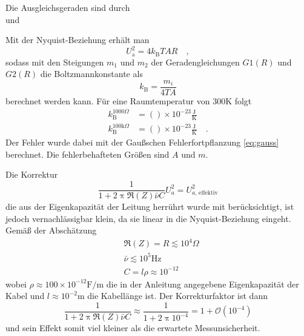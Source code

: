 		Die Ausgleichsgeraden sind durch
		\begin{equation}
			
		\end{equation}
		und
		\begin{equation}
			
		\end{equation}

		Mit der Nyquist-Beziehung erhält man
		\begin{equation}
			U_\text{a}^2 =4k_\text{B}T A R \quad ,
		\end{equation}
		sodass mit den Steigungen $m_1$ und $m_2$ der Geradengleichungen $G1(R)$ und $G2(R)$
		die Boltzmannkonstante als
		\begin{equation}
		k_\text{B}=\frac{m_i}{4 T A}
		\end{equation}
		berechnet werden kann. Für eine Raumtemperatur von $300$K folgt
		\begin{align}
          k_\text{B}^{1000\Omega}			&=  ()\times 10^{-23}\frac{\text{J}}
																			{\text{K}}  \\
                                                                            k_\text{B}^{100\text{k}\Omega}	&=  ()\times 10^{-23}\frac{\text{J}}
																			{\text{K}} \quad .
		\end{align}
		Der Fehler wurde dabei mit der Gaußschen Fehlerfortpflanzung \eqref{eq:gauss} 
		berechnet. Die fehlerbehafteten Größen sind $A$ und $m$.
		
		Die Korrektur
		\begin{equation}
		\frac{1}{1+2 \uppi \Re(Z) \bar{\nu} C} U_a^2 = U_{a\text{, effektiv}}^2
		\end{equation}
		die aus der Eigenkapazität der Leitung herrührt wurde mit berücksichtigt, ist
		jedoch vernachlässigbar klein, da
		sie linear in die Nyquist-Beziehung eingeht. Gemäß der Abschätzung
		\begin{align}
		&\Re(Z) = R  \lesssim  10^4 \Omega \\
		&\bar{\nu}  \lesssim 10^5 \text{Hz} \\
		&C = l \rho  \approx 10^{-12}
		\end{align}
		wobei $\rho\approx 100 \times 10^{-12} \text{F}/\text{m}$ die in
		der Anleitung angegebene Eigenkapazität der Kabel
		und $l\approx 10^{-2}$m die Kabellänge ist. Der Korrekturfaktor ist dann
		\begin{equation}
		\frac{1}{1+2 \uppi \Re(Z) \bar{\nu} C} \approx
		\frac{1}{1+2\uppi 10^{-4}}=1+ \mathcal{O}(10^{-4})
		\end{equation}
		und sein Effekt somit viel kleiner als die erwartete Messunsicherheit.

